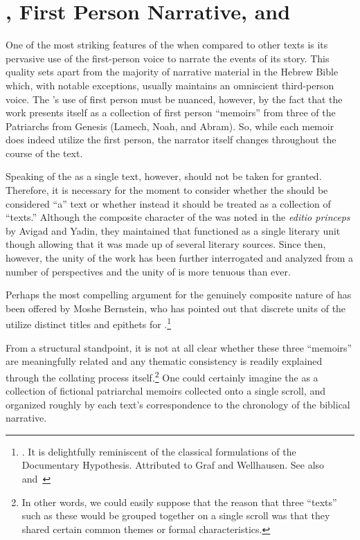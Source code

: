 
\section{\GA, First Person Narrative, and \Psy}

 One of the most striking features of the \ga when compared to other \rwb texts is its pervasive use of the first-person voice to narrate the events of its story. This quality sets \ga apart from the majority of narrative material in the Hebrew Bible which, with notable exceptions, usually maintains an omniscient third-person voice. The \ga's use of first person must be nuanced, however, by the fact that the work presents itself as a collection of first person ``memoirs'' from three of the Patriarchs from Genesis (Lamech, Noah, and Abram). So, while each memoir does indeed utilize the first person, the narrator itself changes throughout the course of the text.
 
Speaking of the \ga as a single text, however, should not be taken for granted. Therefore, it is necessary for the moment to consider whether the \ga should be considered ``a'' text or whether instead it should be treated as a collection of ``texts.''  Although the composite character of the \ga was noted in the \emph{editio princeps} by Avigad and Yadin, they maintained that \ga functioned as a single literary unit though allowing that it was made up of several literary sources.\autocite[38]{avigad-yadin1956} Since then, however, the unity of the work has been further interrogated and analyzed from a number of perspectives and the unity of \ga is more tenuous than ever.

Perhaps the most compelling argument for the genuinely composite nature of \ga has been offered by Moshe Bernstein, who has pointed out that discrete units of the \ga utilize distinct titles and epithets for \yahweh.\footnote{\cite{bernstein_jbl2009}. It is delightfully reminiscent of the classical formulations of the Documentary Hypothesis. Attributed to Graf and Wellhausen.  See also~\cite{bernstein_as2010} and~\cite{weigold_as2010}}

From a structural standpoint, it is not at all clear whether these three ``memoirs'' are meaningfully related and any thematic consistency is readily explained through the collating process itself.\footnote{In other words, we could easily suppose that the reason that three ``texts'' such as these would be grouped together on a single scroll was that they shared certain common themes or formal characteristics.} One could certainly imagine the \ga as a collection of fictional patriarchal memoirs collected onto a single scroll, and organized roughly by each text's correspondence to the chronology of the biblical narrative. 

